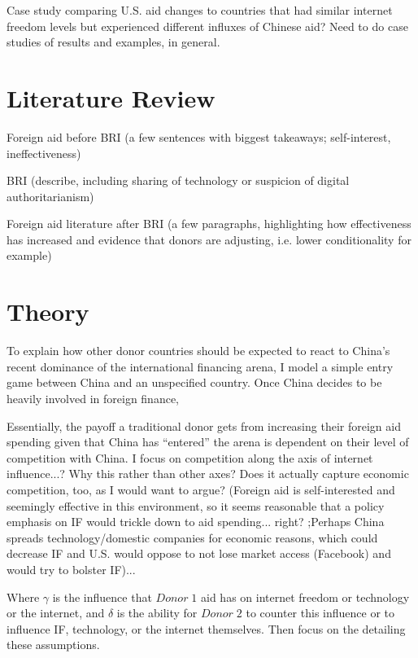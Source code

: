 Case study comparing U.S. aid changes to countries that had similar internet freedom levels but experienced different influxes of Chinese aid? Need to do case studies of results and examples, in general. 
\section*{Literature Review}
Foreign aid before BRI (a few sentences with biggest takeaways; self-interest, ineffectiveness)

BRI (describe, including sharing of technology or suspicion of digital authoritarianism)

Foreign aid literature after BRI (a few paragraphs, highlighting how effectiveness has increased and evidence that donors are adjusting, i.e. lower conditionality for example)

\section*{Theory}
To explain how other donor countries should be expected to react to China's recent dominance of the international financing arena, I model a simple entry game between China and an unspecified country. Once China decides to be heavily involved in foreign finance, 

Essentially, the payoff a traditional donor gets from increasing their foreign aid spending given that China has ``entered'' the arena is dependent on their level of competition with China. I focus on competition along the axis of internet influence...? Why this rather than other axes? Does it actually capture economic competition, too, as I would want to argue? (Foreign aid is self-interested and seemingly effective in this environment, so it seems reasonable that a policy emphasis on IF would trickle down to aid spending... right? ;Perhaps China spreads technology/domestic companies for economic reasons, which could decrease IF and U.S. would oppose to not lose market access (Facebook) and would try to bolster IF)...

Where $\gamma$ is the influence that $Donor\;1$ aid has on internet freedom or technology or the internet, and $\delta$ is the ability for $Donor\;2$ to counter this influence or to influence IF, technology, or the internet themselves. Then focus on the detailing these assumptions.

